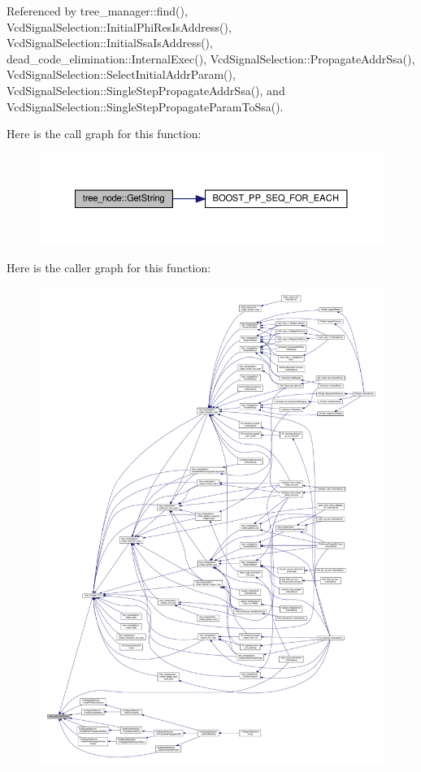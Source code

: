 Referenced by tree\+\_\+manager\+::find(), Vcd\+Signal\+Selection\+::\+Initial\+Phi\+Res\+Is\+Address(), Vcd\+Signal\+Selection\+::\+Initial\+Ssa\+Is\+Address(), dead\+\_\+code\+\_\+elimination\+::\+Internal\+Exec(), Vcd\+Signal\+Selection\+::\+Propagate\+Addr\+Ssa(), Vcd\+Signal\+Selection\+::\+Select\+Initial\+Addr\+Param(), Vcd\+Signal\+Selection\+::\+Single\+Step\+Propagate\+Addr\+Ssa(), and Vcd\+Signal\+Selection\+::\+Single\+Step\+Propagate\+Param\+To\+Ssa().

Here is the call graph for this function\+:
\nopagebreak
\begin{figure}[H]
\begin{center}
\leavevmode
\includegraphics[width=350pt]{df/dbf/classtree__node_aae10f58d0f97a3e0ac02a188eb4ca1f8_cgraph}
\end{center}
\end{figure}
Here is the caller graph for this function\+:
\nopagebreak
\begin{figure}[H]
\begin{center}
\leavevmode
\includegraphics[width=350pt]{df/dbf/classtree__node_aae10f58d0f97a3e0ac02a188eb4ca1f8_icgraph}
\end{center}
\end{figure}
